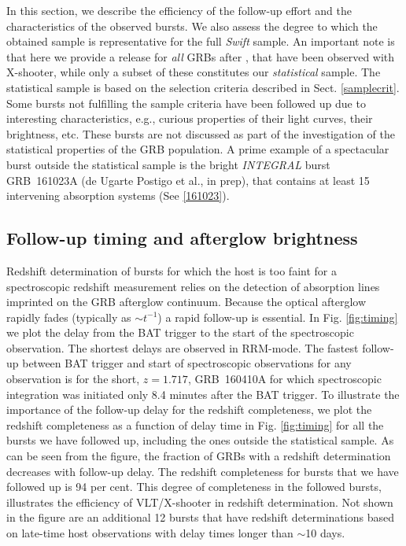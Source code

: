 \documentclass[longauth]{aa}    %
\begin{document}
In this section, we describe the efficiency of the follow-up effort and the
characteristics of the observed bursts. We also assess the degree to which the
obtained sample is representative for the full \textit{Swift} sample. An
important note is that here we provide a release for \textit{all} GRBs after
\startdate, that have been observed with X-shooter, while only a subset of these
constitutes our \textit{statistical} sample. The statistical sample is based on
the selection criteria described in Sect. \ref{samplecrit}. Some bursts not
fulfilling the sample criteria have been followed up due to interesting
characteristics, e.g., curious properties of their light curves, their
brightness, etc. These bursts are not discussed as part of the investigation of
the statistical properties of the GRB population. A prime example of a
spectacular burst outside the statistical sample is the bright \textit{INTEGRAL}
burst GRB~161023A (de Ugarte Postigo et al., in prep), that contains at least 15
intervening absorption systems (See \ref{161023}).

\subsection{Follow-up timing and afterglow brightness} \label{timing}

Redshift determination of bursts for which the host is too faint for a
spectroscopic redshift measurement relies on the detection of absorption lines
imprinted on the GRB afterglow continuum. Because the optical afterglow rapidly
fades (typically as $\sim t^{-1}$) a rapid follow-up is essential. In Fig.
\ref{fig:timing} we plot the delay from the BAT trigger to the start of the
spectroscopic observation. The shortest delays are observed in RRM-mode. The
fastest follow-up between BAT trigger and start of spectroscopic observations
for any observation is for the short, $z = 1.717$, GRB~160410A for which
spectroscopic integration was initiated only 8.4 minutes after the BAT trigger.
To illustrate the importance of the follow-up delay for the redshift
completeness, we plot the redshift completeness as a function of delay time in
Fig. \ref{fig:timing} for all the bursts we have followed up, including the ones
outside the statistical sample. As can be seen from the figure, the fraction of
GRBs with a redshift determination decreases with follow-up delay. The redshift
completeness for bursts that we have followed up is 94 per cent. This degree of
completeness in the followed bursts, illustrates the efficiency of VLT/X-shooter
in redshift determination. Not shown in the figure are an additional 12 bursts
that have redshift determinations based on late-time host observations with
delay times longer than $\sim$10 days.
\end{document}
